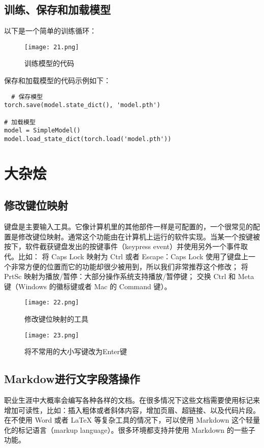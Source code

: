 \documentclass[a4paper, 12pt]{article}
\begin{document}
  
\subsection{训练、保存和加载模型}
以下是一个简单的训练循环：


\begin{figure}[H]
  \centering
\texttt{[image: 21.png]}
  \caption{训练模型的代码}
   \end{figure}  


保存和加载模型的代码示例如下：

\begin{verbatim}
  # 保存模型
torch.save(model.state_dict(), 'model.pth')

# 加载模型
model = SimpleModel()
model.load_state_dict(torch.load('model.pth'))
  \end{verbatim}



 \section{大杂烩}
\subsection{修改键位映射}
键盘是主要输入工具。它像计算机里的其他部件一样是可配置的，一个很常见的配置是修改键位映射。通常这个功能由在计算机上运行的软件实现。当某一个按键被按下，软件截获键盘发出的按键事件（keypress event）并使用另外一个事件取代。比如：
将 Caps Lock 映射为 Ctrl 或者 Escape：Caps Lock 使用了键盘上一个非常方便的位置而它的功能却很少被用到，所以我们非常推荐这个修改；
将 PrtSc 映射为播放/暂停：大部分操作系统支持播放/暂停键；
交换 Ctrl 和 Meta 键（Windows 的徽标键或者 Mac 的 Command 键）。
\begin{figure}[H]
  \centering
    \texttt{[image: 22.png]}
  \caption{修改键位映射的工具}
   \end{figure}  
   
   \begin{figure}[H]
  \centering
    \texttt{[image: 23.png]}
  \caption{将不常用的大小写键改为Enter键}
   \end{figure}  


   
 

\subsection{Markdow进行文字段落操作}
职业生涯中大概率会编写各种各样的文档。在很多情况下这些文档需要使用标记来增加可读性，比如：插入粗体或者斜体内容，增加页眉、超链接、以及代码片段。
在不使用 Word 或者 LaTeX 等复杂工具的情况下，可以使用 Markdown 这个轻量化的标记语言（markup language）。很多环境都支持并使用 Markdown 的一些子功能。
\end{document}
